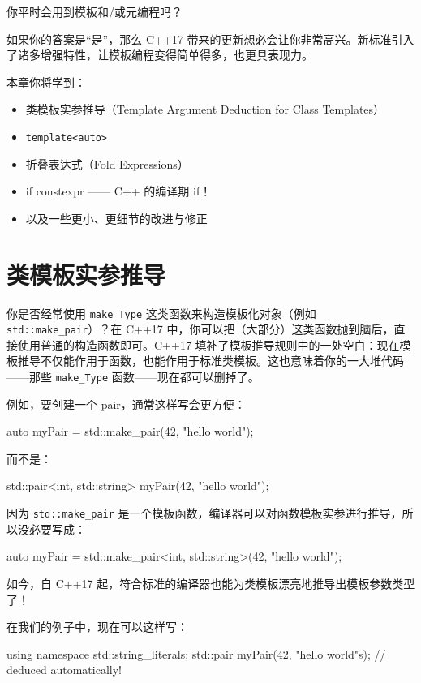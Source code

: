 你平时会用到模板和/或元编程吗？

如果你的答案是“是”，那么 C++17 带来的更新想必会让你非常高兴。新标准引入了诸多增强特性，让模板编程变得简单得多，也更具表现力。

本章你将学到：

\begin{itemize}
\item 类模板实参推导（Template Argument Deduction for Class Templates）
\item \texttt{template<auto>}
\item 折叠表达式（Fold Expressions）
\item if constexpr —— C++ 的编译期 if！
\item 以及一些更小、更细节的改进与修正
\end{itemize}

\section{类模板实参推导}

你是否经常使用 \texttt{make\_Type} 这类函数来构造模板化对象（例如 \texttt{std::make\_pair}）？在 C++17 中，你可以把（大部分）这类函数抛到脑后，直接使用普通的构造函数即可。C++17 填补了模板推导规则中的一处空白：现在模板推导不仅能作用于函数，也能作用于标准类模板。这也意味着你的一大堆代码——那些 \texttt{make\_Type} 函数——现在都可以删掉了。

例如，要创建一个 pair，通常这样写会更方便：

\begin{codebox}[cpp]
auto myPair = std::make_pair(42, "hello world");
\end{codebox}

而不是：

\begin{codebox}[cpp]
std::pair<int, std::string> myPair(42, "hello world");
\end{codebox}

因为 \texttt{std::make\_pair} 是一个模板函数，编译器可以对函数模板实参进行推导，所以没必要写成：

\begin{codebox}[cpp]
auto myPair = std::make_pair<int, std::string>(42, "hello world");
\end{codebox}

如今，自 C++17 起，符合标准的编译器也能为类模板漂亮地推导出模板参数类型了！

在我们的例子中，现在可以这样写：

\begin{codebox}[cpp]
using namespace std::string_literals;
std::pair myPair(42, "hello world"s); // deduced automatically!
\end{codebox}

